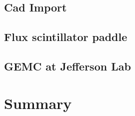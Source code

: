 \subsection{Cad Import}
\label{subsec:cad_import}

\subsection{Flux scintillator paddle}
\label{subsec:flux_scintillator_paddle}

\subsection{GEMC at Jefferson Lab}
\label{subsec:clas12}


\section{Summary}
\label{sec:summary}

